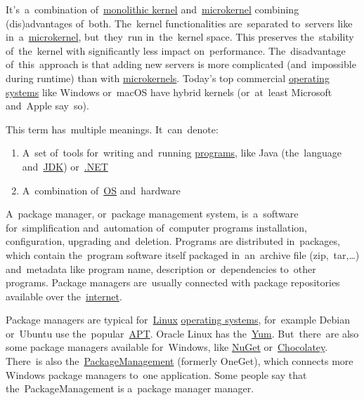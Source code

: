 \label{hybridkernel}
It's~a~combination of~\hyperref[monolithickernel]{monolithic kernel} and~\hyperref[microkernel]{microkernel} combining (dis)advantages of~both.
The~kernel functionalities are~separated to~servers like in~a~\hyperref[microkernel]{microkernel}, but~they~run in~the~kernel space.
This preserves the~stability of~the~kernel with significantly less impact on~performance.
The~disadvantage of~this~approach is that adding new servers is more complicated (and~impossible during runtime) than with \hyperref[microkernel]{microkernels}.
Today's top commercial \hyperref[os]{operating systems} like Windows or~macOS have hybrid kernels (or~at~least Microsoft and~Apple say~so).

\label{platform}
This term has~multiple meanings.
It~can~denote:
\begin{enumerate}[label=\arabic*)]
    \item A~set of~tools for~writing and~running \hyperref[applicationprocessprogramservicethread]{programs}, like Java (the~language and~\hyperref[jdkjrejvm]{JDK}) or~\hyperref[dotnet]{.NET}
    \item A~combination of~\hyperref[os]{OS} and~hardware
\end{enumerate}

\label{packagemanager}
A~package manager, or~package management system, is~a~software for~simplification and~automation of~computer programs installation, configuration, upgrading and~deletion.
Programs are distributed in~packages, which contain the~program software itself packaged in~an~archive file (zip,~tar,\dots) and~metadata like program name, description or~dependencies to~other programs.
Package managers are~usually connected with package repositories available over the~\hyperref[internetweb]{internet}.

Package managers are typical for~\hyperref[linux]{Linux} \hyperref[os]{operating systems}, for~example Debian or~Ubuntu use the~popular~\hyperref[linuxapt]{APT}.
Oracle Linux has the~\href{http://yum.baseurl.org/}{Yum}.
But~there~are also some package managers available for~Windows, like \href{https://www.nuget.org/}{NuGet} or~\href{https://chocolatey.org/}{Chocolatey}.
There~is also the~\hyperref[windowspackagemanagement]{PackageManagement} (formerly OneGet), which connects more Windows package managers to~one application.
Some people say that the~PackageManagement is a~package manager manager.

